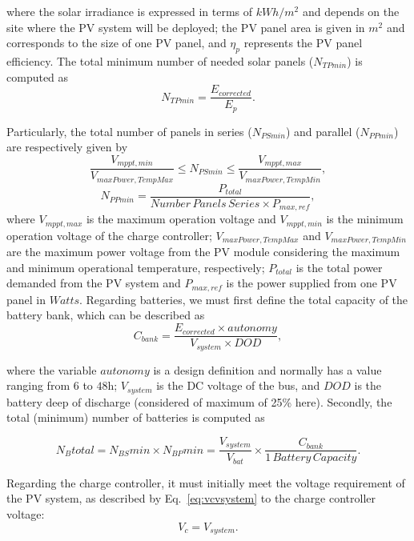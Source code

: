 \noindent where the solar irradiance is expressed in terms of $kWh/m^{2}$ and depends on the site where the PV system will be deployed; 
the PV panel area is given in $m^{2}$ and corresponds to the size of one PV panel, and $\eta_{p}$ represents the PV panel efficiency.
The total minimum number of needed solar panels ($N_{TPmin}$) is computed as
%
\begin{equation}
\label{eq:NTPmin}
N_{TPmin} = \dfrac{E_{corrected}}{E_{p}}.
\end{equation}

Particularly, the total number of panels in series ($N_{PSmin}$) and parallel ($N_{PPmin}$) are respectively given by
%
\begin{equation}
\label{eq:NPSmin}
\dfrac{V_{mppt,min}}{V_{maxPower,TempMax}} \leq N_{PSmin} \leq \dfrac{V_{mppt,max}}{V_{maxPower,TempMin}},
\end{equation}
%
\begin{equation}
\label{eq:NPPmin}
N_{PPmin} = \dfrac{P_{total}}{Number\,Panels\,Series \times P_{max,ref}},
\end{equation}
%
\noindent where $V_{mppt,max}$ is the maximum operation voltage and $V_{mppt,min}$ 
is the minimum operation voltage of the charge controller; $V_{maxPower,TempMax}$ and 
$V_{maxPower,TempMin}$ are the maximum power voltage from the PV module considering 
the maximum and minimum operational temperature, respectively; 
$P_{total}$ is the total power demanded from the PV system and 
$P_{max,ref}$ is the power supplied from one PV panel in $Watts$.
Regarding batteries, we must first define the total capacity of the battery bank, which can be described as
%
\begin{equation}
\label{eq:Cbank}
C_{bank} = \dfrac{E_{corrected} \times autonomy}{V_{system} \times DOD},
\end{equation}

\noindent where the variable $autonomy$ is a design definition and normally has a value ranging from $6$ to $48$h; 
$ V_{system} $ is the DC voltage of the bus, and $ DOD $ is the battery deep of discharge (considered of maximum of 25\% here).
%
Secondly, the total (minimum) number of batteries is computed as 

\begin{equation}
\label{eq:Nbtotal}
N_{B}total = N_{BS}min \times N_{BP}min = \dfrac{V_{system}}{V_{bat}} \times \dfrac{C_{bank}}{1 \,Battery \, Capacity}.
\end{equation}

Regarding the charge controller, it must initially meet the voltage requirement of the PV system, as described by Eq.~\eqref{eq:vcvsystem} to the charge controller voltage: 
\begin{equation}
\label{eq:vcvsystem}
V_{c} = V_{system}.
\end{equation}

